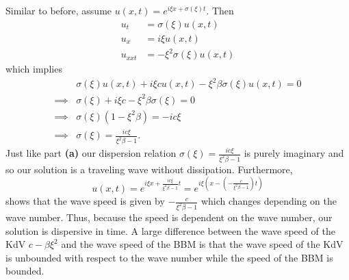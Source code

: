 \documentclass[a4paper,12pt]{article}
\begin{document}
\begin{enumerate}[label = \textbf{(\alph*)}]
		Similar to before, assume $ u(x,t) = e^{i\xi x + \sigma(\xi)t} $. Then
		\begin{align*}
			u_t        &= \sigma(\xi) u(x,t) \\
			u_x       &= i \xi u(x,t) \\
			u_{xxt} &= -\xi^2 \sigma(\xi) u(x,t)
		\end{align*}
		which implies
		\begin{align*}
			& \sigma(\xi)u(x,t) + i \xi c u(x,t) - \xi^2\beta \sigma(\xi) u(x,t) = 0 \\
			\implies & \sigma(\xi) + i \xi c - \xi^2\beta \sigma(\xi) = 0 \\
			\implies & \sigma(\xi)(1 - \xi^2 \beta) = -i c \xi \\
			\implies & \sigma(\xi) = \frac{i c \xi}{\xi^2 \beta - 1}.
		\end{align*}
		Just like part \textbf{(a)} our dispersion relation $ \sigma(\xi) = \frac{i c \xi}{\xi^2 \beta - 1} $ is purely imaginary and so our solution is a traveling wave without dissipation. Furthermore,
		\[
			u(x,t) = e^{i \xi x + \frac{i c \xi}{\xi^2 \beta - 1} t} = e^{i \xi \left (x -\left (- \frac{c}{\xi^2 \beta - 1}\right ) t\right )}
		\]
		shows that the wave speed is given by $ -\frac{c}{\xi^2 \beta - 1} $ which changes depending on the wave number. Thus, because the speed is dependent on the wave number, our solution is dispersive in time. A large difference between the wave speed of the KdV $ c - \beta \xi^2 $ and the wave speed of the BBM is that the wave speed of the KdV is unbounded with respect to the wave number while the speed of the BBM is bounded.
	\end{enumerate}
\end{document}
